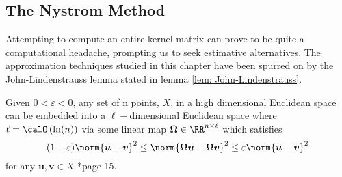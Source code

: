 \subsection{The Nystrom Method}\label{Section2.1}

Attempting to compute an entire kernel matrix can prove to be quite a computational headache, prompting us to seek estimative alternatives. The approximation techniques studied in this chapter have been spurred on by the John-Lindenstrauss lemma stated in lemma \ref{lem: John-Lindenstrauss}.

\begin{lem} \label{lem: John-Lindenstrauss}
    Given $0 < \varepsilon < 0$, any set of n points, $X$, in a high dimensional Euclidean space can be embedded into a $\ell-$dimensional Euclidean space where $\ell = \calO \left( \ln (n) \right)$ via some linear map $\bm{\Omega} \in \RR^{n \times \ell}$ which satisfies
    \[
        (1 - \varepsilon) \norm{\bm{u} - \bm{v}}^2 \leq \norm{\bm{\Omega} \bm{u} - \bm{\Omega} \bm{v}}^2 \leq \varepsilon \norm{\bm{u} - \bm{v}}^2
    \]
    for any $\bm{u}, \bm{v} \in X$ \cite{DBLP:journals/corr/abs-1104-5557}*{page 15}.
\end{lem}

